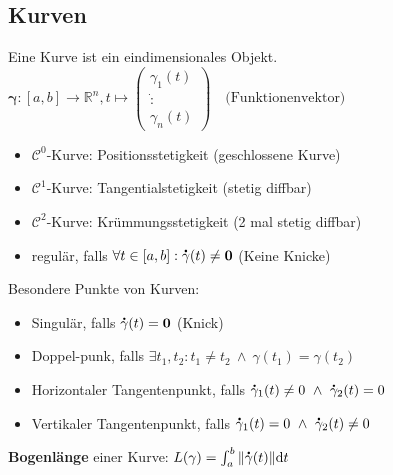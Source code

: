 \documentclass[6pt,a4paper]{scrartcl}
\let\olddot = \dot
\newcommand{\norm}[1]{\ensuremath{\|#1\|}}														%
\newcommand{\svdots}{\ensuremath{\olddot :}}													%
\renewcommand{\vec}[1]{\ensuremath{\boldsymbol {#1}}}											%
\renewcommand{\emph}[1]{\textbf{#1}}															%
\renewcommand*{\dot}[1]{\accentset{\mbox{\textrm{\large\bfseries .}} }{#1}}						%
\begin{document}
\begin{multicols*}{4}
\section{Kurven}
Eine Kurve ist ein eindimensionales Objekt.\\
$ \vec \gamma:[a,b] \rightarrow \mathbb R^n, t \mapsto \begin{pmatrix} \gamma_1(t) \\ \svdots \\ \gamma_n(t) \end{pmatrix} \quad \text{(Funktionenvektor)} $
\begin{itemize}\itemsep-2pt
	\item $\mathcal C^0$-Kurve: Positionsstetigkeit (geschlossene Kurve)
	\item $\mathcal C^1$-Kurve: Tangentialstetigkeit (stetig diffbar)
	\item $\mathcal C^2$-Kurve: Krümmungsstetigkeit (2 mal stetig diffbar)
	\item regulär, falls $\forall t \in [a,b]:\dot \gamma(t) \ne \vec 0$ (Keine Knicke)
\end{itemize}
Besondere Punkte von Kurven:
\begin{itemize}\itemsep-2pt
	\item Singulär, falls $\dot \gamma(t)=\vec 0$ (Knick)
	\item Doppel-punk, falls $\exists t_1,t_2:t_1 \ne t_2 \ \land \ \gamma(t_1)=\gamma(t_2)$
	\item Horizontaler Tangentenpunkt, falls $\dot \gamma_1(t) \ne 0 \ \land \ \dot \gamma_2(t)=0$
	\item Vertikaler Tangentenpunkt, falls $\dot \gamma_1(t) = 0 \ \land \ \dot \gamma_2(t) \ne 0$
\end{itemize}
\emph{Bogenlänge} einer Kurve: $L(\gamma) = \int_{a}^{b} \norm{\dot \gamma(t)} \mathrm dt$ \\



\end{multicols*}
\end{document}
